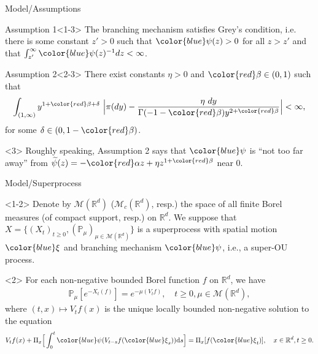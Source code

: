 \documentclass[xcolor=dvipsnames]{beamer}
\begin{document}
\begin{frame}{Model/Assumptions}
\begin{block}{Assumption 1}<1-3>
	The branching mechanism satisfies Grey's condition, i.e. there is some constant $z' > 0$ such that ${\color{blue}\psi}(z) > 0$ for all $z>z'$ and that $\int_{z'}^\infty {\color{blue}\psi}(z)^{-1}dz < \infty$.
\end{block}
\begin{block}{Assumption 2}<2-3>
There exist constants $\eta > 0$ and ${\color{red}\beta} \in (0,1)$ such that
$$
    \int_{(1,\infty)}y^{1+ {\color{red} \beta} +\delta}~\Big|\pi(dy)-\frac{\eta~dy}{\Gamma(-1-{\color{red}\beta})y^{2+{\color{red}\beta}}}\Big| <\infty,
$$
	for some $\delta \in (0, 1-{\color{red}\beta})$.
\end{block}
\begin{block}{}<3>
Roughly speaking, Assumption 2 says that ${\color{blue}\psi}$ is ``not too far away'' from
$\widetilde \psi(z)= -{\color{red}\alpha} z+\eta z^{1+{\color{red}\beta}}$ near 0.
\end{block}
\end{frame}

\begin{frame}{Model/Superprocess}
\begin{block}{}<1-2>
Denote by $\mathcal M(\mathbb R^d)$ ($\mathcal M_c(\mathbb R^d)$, resp.) the space of all finite Borel measures (of compact support, resp.) on $\mathbb R^d$. We suppose that $X=\{(X_t)_{t\ge 0}, 
(\mathbb P_\mu)_{\mu \in \mathcal M(\mathbb R^d)}\}$ is a {\color{PineGreen}superprocess} with {\color{PineGreen}spatial motion} ${\color{blue}\xi}$ and {\color{PineGreen}branching mechanism} ${\color{blue}\psi}$, i.e., a {\color{PineGreen} super-OU process}.
\end{block}
\begin{block}{}<2>
	For each non-negative bounded Borel function $f$ on $\mathbb R^d$, we have
	\begin{align}
		\label{eq: def of V_t}
		\mathbb{P}_{\mu}[e^{-X_t(f)}]
		= e^{-\mu(V_tf)},
		\quad t\geq 0, \mu \in \mathcal M(\mathbb R^d),
	\end{align}
	where $(t,x) \mapsto V_tf(x)$ is the unique locally bounded non-negative solution to the equation
	\begin{align}
		V_tf(x) + \Pi_x \Big[ \int_0^t {\color{blue}\psi} (V_{t-s}f({\color{blue}\xi}_s) ) \mathrm ds\Big]
		= \Pi_x [f({\color{blue}\xi}_t)],
		\quad x\in \mathbb R^d, t\geq 0.
	\end{align}	
\end{block}
\end{frame}
\end{document}
